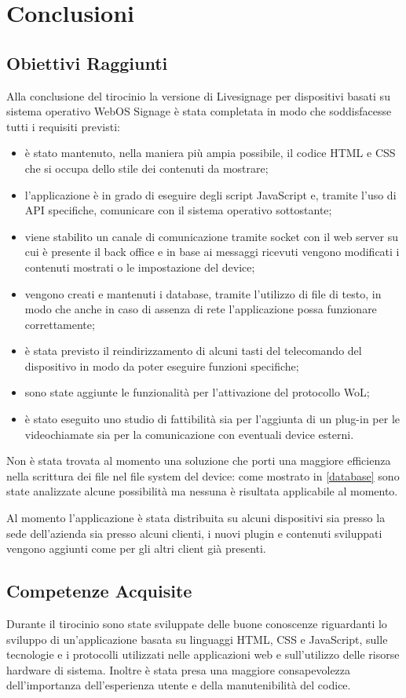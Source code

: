\chapter{Conclusioni}

\section{Obiettivi Raggiunti}
Alla conclusione del tirocinio la versione di Livesignage per dispositivi basati su sistema operativo WebOS Signage è stata completata in modo che soddisfacesse tutti i requisiti previsti:

\begin{itemize}
    \item è stato mantenuto, nella maniera più ampia possibile, il codice HTML e CSS che si occupa dello stile dei contenuti da mostrare;
    \item l'applicazione è in grado di eseguire degli script JavaScript e, tramite l'uso di API specifiche, comunicare con il sistema operativo sottostante;
    \item viene stabilito un canale di comunicazione tramite socket con il web server su cui è presente il back office e in base ai messaggi ricevuti vengono modificati i contenuti mostrati o le impostazione del device;
    \item vengono creati e mantenuti i database, tramite l'utilizzo di file di testo, in modo che anche in caso di assenza di rete l'applicazione possa funzionare correttamente;
    \item è stata previsto il reindirizzamento di alcuni tasti del telecomando del dispositivo in modo da poter eseguire funzioni specifiche;
    \item sono state aggiunte le funzionalità per l'attivazione del protocollo WoL;
    \item è stato eseguito uno studio di fattibilità sia per l'aggiunta di un plug-in per le videochiamate sia per la comunicazione con eventuali device esterni.
\end{itemize}

Non è stata trovata al momento una soluzione che porti una maggiore efficienza nella scrittura dei file nel file system del device: come mostrato in \ref*{database} sono state analizzate alcune possibilità ma nessuna è risultata applicabile al momento.

Al momento l'applicazione è stata distribuita su alcuni dispositivi sia presso la sede dell'azienda sia presso alcuni clienti, i nuovi plugin e contenuti sviluppati vengono aggiunti come per gli altri client già presenti.

\section{Competenze Acquisite}

Durante il tirocinio sono state sviluppate delle buone conoscenze riguardanti lo sviluppo di un'applicazione basata su linguaggi HTML, CSS e JavaScript, sulle tecnologie e i protocolli utilizzati nelle applicazioni web e sull'utilizzo delle risorse hardware di sistema. 
Inoltre è stata presa una maggiore consapevolezza dell'importanza dell'esperienza utente e della manutenibilità del codice.

